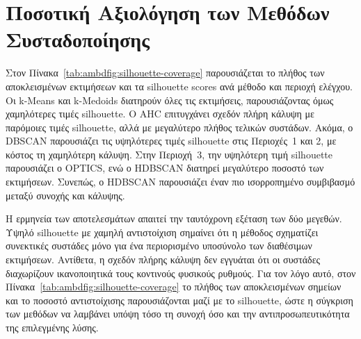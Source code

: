 \section{Ποσοτική Αξιολόγηση των Μεθόδων Συσταδοποίησης}

Στον Πίνακα~\ref{tab:ambdfig:silhouette-coverage} παρουσιάζεται το πλήθος των αποκλεισμένων εκτιμήσεων και τα silhouette scores ανά μέθοδο και περιοχή ελέγχου. Οι k-Means και k-Medoids διατηρούν όλες τις εκτιμήσεις, παρουσιάζοντας όμως χαμηλότερες τιμές silhouette. Ο AHC επιτυγχάνει σχεδόν πλήρη κάλυψη με παρόμοιες τιμές silhouette, αλλά με μεγαλύτερο πλήθος τελικών συστάδων. Ακόμα, ο DBSCAN παρουσιάζει τις υψηλότερες τιμές silhouette στις Περιοχές~1 και 2, με κόστος τη χαμηλότερη κάλυψη. Στην Περιοχή~3, την υψηλότερη τιμή silhouette παρουσιάζει ο OPTICS, ενώ ο HDBSCAN διατηρεί μεγαλύτερο ποσοστό των εκτιμήσεων. Συνεπώς, ο HDBSCAN παρουσιάζει έναν πιο ισορροπημένο συμβιβασμό μεταξύ συνοχής και κάλυψης.

Η ερμηνεία των αποτελεσμάτων απαιτεί την ταυτόχρονη εξέταση των δύο μεγεθών. Υψηλό silhouette με χαμηλή αντιστοίχιση σημαίνει ότι η μέθοδος σχηματίζει συνεκτικές συστάδες μόνο για ένα περιορισμένο υποσύνολο των διαθέσιμων εκτιμήσεων. Αντίθετα, η σχεδόν πλήρης κάλυψη δεν εγγυάται ότι οι συστάδες διαχωρίζουν ικανοποιητικά τους κοντινούς φυσικούς ρυθμούς. Για τον λόγο αυτό, στον Πίνακα~\ref{tab:ambdfig:silhouette-coverage} το πλήθος των αποκλεισμένων σημείων και το ποσοστό αντιστοίχισης παρουσιάζονται μαζί με το silhouette, ώστε η σύγκριση των μεθόδων να λαμβάνει υπόψη τόσο τη συνοχή όσο και την αντιπροσωπευτικότητα της επιλεγμένης λύσης.

